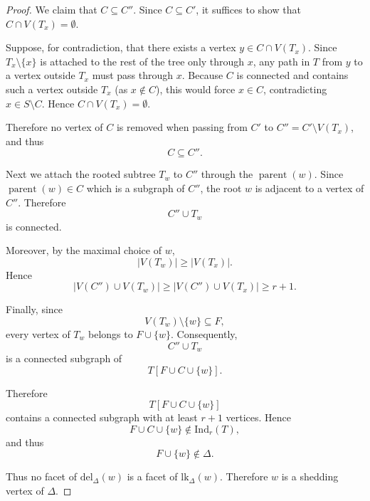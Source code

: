 \documentclass[10pt,a4paper]{amsart}
\def\Ind{\mathrm{Ind}}
\def\del{\mathrm{del}}
\def\lk{\mathrm{lk}}
\begin{document}
\begin{proof}
We claim that \(C \subseteq C''\). Since \(C \subseteq C'\), it suffices to show that \(C \cap V(T_x) = \emptyset\).

Suppose, for contradiction, that there exists a vertex \(y \in C \cap V(T_x)\). Since \(T_x \setminus \{x\}\) is attached to the rest of the tree only through \(x\), any path in \(T\) from \(y\) to a vertex outside \(T_x\) must pass through \(x\). Because \(C\) is connected and contains such a vertex outside \(T_x\) (as \(x \notin C\)), this would force \(x \in C\), contradicting \(x \in S \setminus C\). Hence \(C \cap V(T_x) = \emptyset\).

Therefore no vertex of \(C\) is removed when passing from \(C'\) to \(C'' = C' \setminus V(T_x)\), and thus
\[
C \subseteq C''.
\]

Next we attach the rooted subtree \(T_w\) to $C''$ through the $\operatorname{parent}(w)$. Since $\operatorname{parent}(w)\in C$ which is a subgraph of  $C''$,
the root \(w\) is adjacent to a vertex of \(C''\). Therefore
\[
C''\cup T_w
\]
is connected.

Moreover, by the maximal choice of \(w\),
\[
|V(T_w)|\ge |V(T_x)|.
\]
Hence
\[
|V(C'') \cup V(T_w)|
\ge
|V(C'') \cup V(T_x)| \ge r+1.
\]

Finally, since
\[
V(T_w)\setminus\{w\}\subseteq F,
\]
every vertex of \(T_w\) belongs to \(F\cup\{w\}\). Consequently,
\[
C''\cup T_w
\]
is a connected subgraph of
\[
T[F\cup C\cup\{w\}].
\]

Therefore
\[
T[F\cup C\cup\{w\}]
\]
contains a connected subgraph with at least \(r+1\) vertices. Hence
\[
F\cup C\cup\{w\}\notin\Ind_r(T),
\]
and thus
\[
F\cup\{w\}\notin\Delta.
\]

Thus no facet of \(\del_\Delta(w)\) is a facet of \(\lk_\Delta(w)\). Therefore \(w\) is a
shedding vertex of \(\Delta\).
\end{proof}
\end{document}
